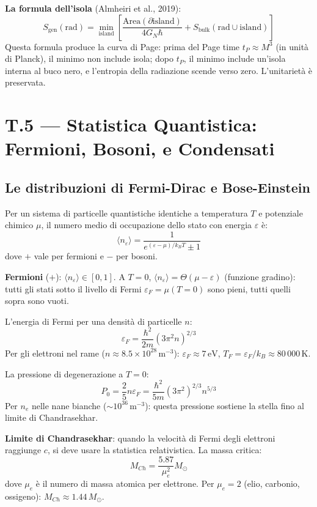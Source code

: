 \documentclass[11.5pt,a4paper,openany]{book}
\theoremstyle{remark}
\begin{document}
\textbf{La formula dell'isola} (Almheiri et al., 2019):
\[
S_{\text{gen}}(\text{rad}) = \min_{\text{island}}\left[\frac{\text{Area}(\partial\text{island})}{4G_N\hbar} + S_{\text{bulk}}(\text{rad} \cup \text{island})\right]
\]
Questa formula produce la curva di Page: prima del Page time $t_P \approx M^3$ (in unità di Planck), il minimo non include isola; dopo $t_P$, il minimo include un'isola interna al buco nero, e l'entropia della radiazione scende verso zero. L'unitarietà è preservata.

\chapter*{T.5 — Statistica Quantistica: Fermioni, Bosoni, e Condensati}

\section{Le distribuzioni di Fermi-Dirac e Bose-Einstein}

Per un sistema di particelle quantistiche identiche a temperatura $T$ e potenziale chimico $\mu$, il numero medio di occupazione dello stato con energia $\varepsilon$ è:
\[
\langle n_\varepsilon \rangle = \frac{1}{e^{(\varepsilon - \mu)/k_B T} \pm 1}
\]
dove $+$ vale per fermioni e $-$ per bosoni.

\textbf{Fermioni} ($+$): $\langle n_\varepsilon \rangle \in [0, 1]$. A $T = 0$, $\langle n_\varepsilon \rangle = \Theta(\mu - \varepsilon)$ (funzione gradino): tutti gli stati sotto il livello di Fermi $\varepsilon_F = \mu(T=0)$ sono pieni, tutti quelli sopra sono vuoti.

L'energia di Fermi per una densità di particelle $n$:
\[
\varepsilon_F = \frac{\hbar^2}{2m}\left(3\pi^2 n\right)^{2/3}
\]
Per gli elettroni nel rame ($n \approx 8.5 \times 10^{28}\,\mathrm{m}^{-3}$): $\varepsilon_F \approx 7\,\mathrm{eV}$, $T_F = \varepsilon_F/k_B \approx 80\,000\,\mathrm{K}$.

La pressione di degenerazione a $T = 0$:
\[
P_0 = \frac{2}{5} n \varepsilon_F = \frac{\hbar^2}{5m}\left(3\pi^2\right)^{2/3} n^{5/3}
\]
Per $n_e$ nelle nane bianche ($\sim 10^{36}\,\mathrm{m}^{-3}$): questa pressione sostiene la stella fino al limite di Chandrasekhar.

\textbf{Limite di Chandrasekhar}: quando la velocità di Fermi degli elettroni raggiunge $c$, si deve usare la statistica relativistica. La massa critica:
\[
M_{Ch} = \frac{5.87}{\mu_e^2} M_\odot
\]
dove $\mu_e$ è il numero di massa atomica per elettrone. Per $\mu_e = 2$ (elio, carbonio, ossigeno): $M_{Ch} \approx 1.44\,M_\odot$.
\end{document}
